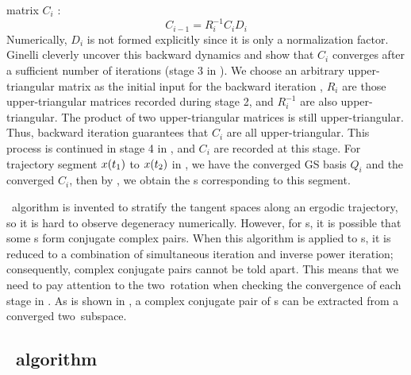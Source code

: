 matrix $C_i$ :
\begin{equation}
  \label{eq:cv_back}
  C_{i-1} = R^{-1}_{i} C_iD_i
\end{equation}
Numerically, $D_i$ is
not formed explicitly since it is only a normalization factor.
Ginelli \etal{}  cleverly uncover
this backward dynamics and show that $C_i$ converges after a sufficient
number of iterations (stage 3 in ). We choose an arbitrary
upper-triangular matrix as the initial input for the backward iteration
, $R_i$ are those upper-triangular matrices recorded during
stage 2, and $R_i^{-1}$ are also upper-triangular. The product of two
upper-triangular matrices is still upper-triangular. Thus, backward iteration
 guarantees that $C_i$ are all upper-triangular.
This process
is continued in stage 4 in , and $C_i$ are recorded
at this stage.
For trajectory segment $x(t_1)$ to $x(t_2)$ in ,
we have the converged GS basis $Q_i$ and the converged $C_i$,
then by ,
we obtain the \cLv s corresponding to this segment.

\CLv\ algorithm is invented to stratify the tangent spaces along
an ergodic trajectory, so it is hard to observe
degeneracy numerically. However, for \po s, it is
possible that some \Fv s form conjugate complex pairs.
When this algorithm is applied to \po s, it is reduced
to a combination of simultaneous iteration and inverse
power iteration;
consequently, complex conjugate pairs cannot be told apart.
This
means that we need to pay attention to the two\dmn\ rotation
when checking the convergence of each stage in .
As is shown in , a complex conjugate pair
of \Fv s can be extracted from a converged
two\dmn\ subspace.

\subsection{\Psd\ algorithm}
\label{subsec:psd}

